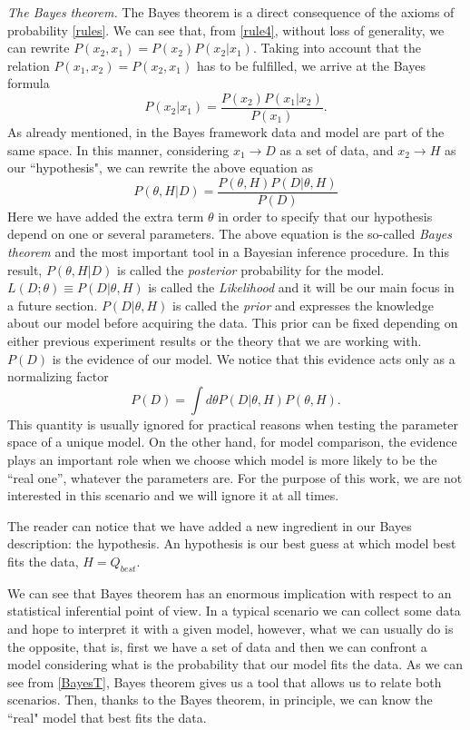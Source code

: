 \documentclass[onecolumn,           %
               showpacs,            %
               preprintnumbers,     %
               aps,                 %
               prl,          	    %
               letterpaper,             %
               superscriptaddress,      %
               nofootinbib,         %
               tightenlines,        %
               floats,floatfix      %
               ,usenatbib,
               ]{revtex4-1}
\begin{document}
\textit{The Bayes theorem.} The Bayes theorem is a direct consequence of the axioms of probability \eqref{rules}. We can see that, from \eqref{rule4}, without loss of generality, we can rewrite $P(x_2,x_1)=P(x_2)P(x_2|x_1)$. Taking into account that the relation $P(x_1,x_2)=P(x_2,x_1)$ has to be fulfilled, we arrive at the Bayes formula   
\begin{equation}
P(x_2|x_1)=\frac{P(x_2)P(x_1|x_2)}{P(x_1)}.
\end{equation}
As already mentioned, in the Bayes framework data and model are part of the same space. In this manner, considering $x_1\rightarrow D$ as a set of data, and $x_2\rightarrow H$ as our ``hypothesis", we can rewrite the above equation as
\begin{equation}\label{BayesT}
P(\theta,H|D)=\frac{P(\theta,H)P(D|\theta,H)}{P(D)}
\end{equation}
Here we have added the extra term $\theta$ in order to specify that our hypothesis depend on one or several parameters. 
The above equation is the so-called \textit{Bayes theorem} and the most important tool in a Bayesian inference procedure. In this result, $P(\theta,H|D)$ is called the \textit{posterior} probability for the model. $L(D;\theta)\equiv P(D|\theta,H)$ is called the \textit{Likelihood} and it will be our main focus in a future section. $P(D|\theta,H)$ is called the \textit{prior} and expresses the knowledge about our model before acquiring the data. This prior can be fixed depending on either previous experiment results or the theory that we are working with. $P(D)$ is the evidence of our model. We notice that this evidence acts only as a normalizing factor
\begin{equation}\label{PD}
P(D)=\int d\theta P(D|\theta,H)P(\theta,H).
\end{equation}
This quantity is usually ignored for practical reasons when testing the parameter space of a unique model. On the other hand, for model comparison, the evidence plays an important role when we choose which model is more likely to be the ``real one'', whatever the parameters are. For the purpose of this work, we are not interested in this scenario and we will ignore it at all times.

The reader can notice that we have added a new ingredient in our Bayes description: the hypothesis. An hypothesis is our best guess at which model best fits the data, $H=Q_{best}$.

We can see that Bayes theorem has an enormous implication with respect to an statistical inferential point of view. In a typical scenario we can collect some data and hope to interpret it with a given model, however, what we can usually do is the opposite, that is, first we have a set of data and then we can confront a model considering what is the probability that our model fits the data. As we can see from \eqref{BayesT}, Bayes theorem gives us a tool that allows us to relate both scenarios. Then, thanks to the Bayes theorem, in principle, we can know the ``real" model that best fits the data. 
\end{document}
